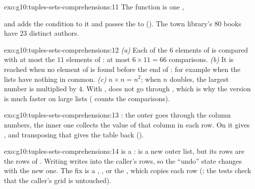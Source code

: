 \begin{solution}{exo:g10:tuples-sets-comprehensions:11}
The function  is one  ,

\smallskip\noindent\hspace*{2em}

\smallskip\noindent and  adds the condition  to it and
passes the  to  (). The town library's $80$ books have $23$ distinct authors.
\end{solution}

\begin{solution}{exo:g10:tuples-sets-comprehensions:12}
\emph{(a)} Each of the $6$ elements of  is compared with at most the $11$ elements of : at most
$6 \times 11 = 66$ comparisons. \emph{(b)} It is reached when no element of  is found before the end of
: for example when the lists have nothing in common. \emph{(c)} $n \times n = n^2$; when $n$ doubles, the
largest number is multiplied by $4$. With ,  does not go through , which is why the 
version is much faster on large lists ( counts the comparisons).
\end{solution}

\begin{solution}{exo:g10:tuples-sets-comprehensions:13}
: the outer  goes through the
column numbers, the inner one collects the value of that column in each row. On \code{[[1, 2, 3], [4, 5, 6]]} it gives
\code{[[1, 4], [2, 5], [3, 6]]}, and transposing that gives the table back ().
\end{solution}

\begin{solution}{exo:g10:tuples-sets-comprehensions:14}
 is a :  is a new outer list, but its rows are the rows of . Writing
 writes into the caller's rows, so the ``undo'' state changes with the new one. The fix is a ,
, or the  , which copies each
row (; the tests check that the caller's grid is untouched).
\end{solution}

